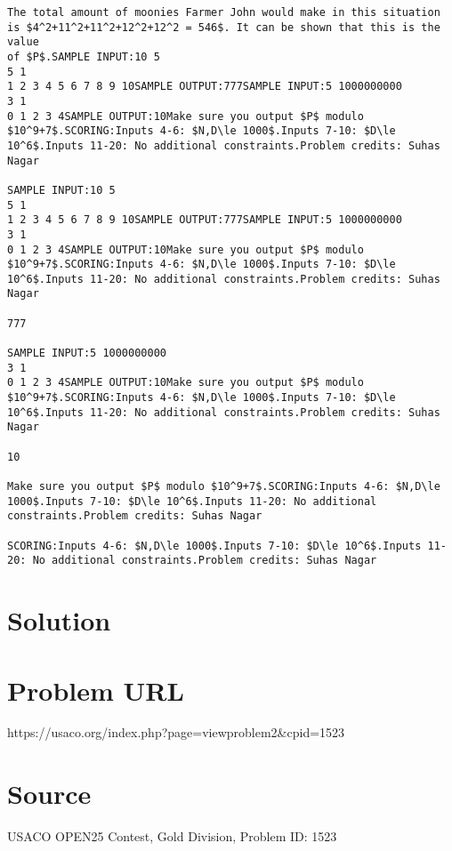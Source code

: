 \documentclass[12pt]{article}
\begin{document}
\begin{verbatim}
The total amount of moonies Farmer John would make in this situation is $4^2+11^2+11^2+12^2+12^2 = 546$. It can be shown that this is the value
of $P$.SAMPLE INPUT:10 5
5 1
1 2 3 4 5 6 7 8 9 10SAMPLE OUTPUT:777SAMPLE INPUT:5 1000000000
3 1
0 1 2 3 4SAMPLE OUTPUT:10Make sure you output $P$ modulo $10^9+7$.SCORING:Inputs 4-6: $N,D\le 1000$.Inputs 7-10: $D\le 10^6$.Inputs 11-20: No additional constraints.Problem credits: Suhas Nagar

SAMPLE INPUT:10 5
5 1
1 2 3 4 5 6 7 8 9 10SAMPLE OUTPUT:777SAMPLE INPUT:5 1000000000
3 1
0 1 2 3 4SAMPLE OUTPUT:10Make sure you output $P$ modulo $10^9+7$.SCORING:Inputs 4-6: $N,D\le 1000$.Inputs 7-10: $D\le 10^6$.Inputs 11-20: No additional constraints.Problem credits: Suhas Nagar

777

SAMPLE INPUT:5 1000000000
3 1
0 1 2 3 4SAMPLE OUTPUT:10Make sure you output $P$ modulo $10^9+7$.SCORING:Inputs 4-6: $N,D\le 1000$.Inputs 7-10: $D\le 10^6$.Inputs 11-20: No additional constraints.Problem credits: Suhas Nagar

10

Make sure you output $P$ modulo $10^9+7$.SCORING:Inputs 4-6: $N,D\le 1000$.Inputs 7-10: $D\le 10^6$.Inputs 11-20: No additional constraints.Problem credits: Suhas Nagar

SCORING:Inputs 4-6: $N,D\le 1000$.Inputs 7-10: $D\le 10^6$.Inputs 11-20: No additional constraints.Problem credits: Suhas Nagar
\end{verbatim}

\section*{Solution}


\section*{Problem URL}
https://usaco.org/index.php?page=viewproblem2&cpid=1523

\section*{Source}
USACO OPEN25 Contest, Gold Division, Problem ID: 1523
\end{document}
